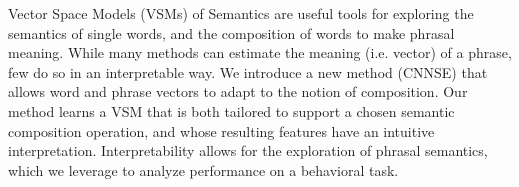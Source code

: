 Vector Space Models (VSMs) of Semantics are useful tools for exploring the semantics of single words, and the composition of words to make phrasal meaning.  While many methods can estimate the meaning (i.e. vector) of a phrase, few do so in an interpretable way.  We introduce a new method (CNNSE) that allows word and phrase vectors to adapt to the notion of composition.  Our method learns a VSM that is both tailored to support a chosen semantic composition operation, and whose resulting features have an intuitive interpretation.  Interpretability allows for the exploration of phrasal semantics, which we leverage to analyze performance on a behavioral task.
